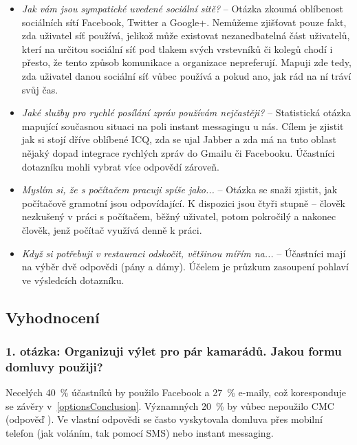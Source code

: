 \documentclass[12pt,oneside,final]{fithesis2}
\begin{document}
\begin{itemize}
    \item \emph{Jak vám jsou sympatické uvedené sociální sitě?} --
        Otázka zkoumá oblíbenost sociálních sítí Facebook, Twitter a Google+. Nemůžeme zjišťovat pouze fakt, zda uživatel síť používá, jelikož může existovat nezanedbatelná část uživatelů, kterí na určitou sociální síť pod tlakem svých vrstevníků či kolegů chodí i přesto, že tento způsob komunikace a organizace nepreferují. Mapuji zde tedy, zda uživatel danou sociální síť vůbec používá a pokud ano, jak rád na ní tráví svůj čas.

    \item \emph{Jaké služby pro rychlé posílání zpráv používám nejčastěji?} --
        Statistická otázka mapující současnou situaci na poli instant messagingu u nás. Cílem je zjistit jak si stojí dříve oblíbené ICQ, zda se ujal Jabber a zda má na tuto oblast nějaký dopad integrace rychlých zpráv do Gmailu či Facebooku. Účastníci dotazníku mohli vybrat více odpovědí zároveň.

    \item \emph{Myslím si, že s počítačem pracuji spíše jako...} --
        Otázka se snaži zjistit, jak počítačově gramotní jsou odpovídající. K dispozici jsou čtyři stupně -- člověk nezkušený v práci s počítačem, běžný uživatel, potom pokročilý a nakonec člověk, jenž počítač využívá denně k práci.

    \item \emph{Když si potřebuji v restauraci odskočit, většinou mířím na...} --
        Účastníci mají na výběr dvě odpovědi (pány a dámy). Účelem je průzkum zasoupení pohlaví ve výsledcích dotazníku.
\end{itemize}

\subsection{Vyhodnocení}

\subsubsection*{\textbf{1. otázka: Organizuji výlet pro pár kamarádů. Jakou formu domluvy použiji?}}
Necelých 40~\% účastníků by použilo Facebook a 27~\% e-maily, což koresponduje se závěry v~\ref{optionsConclusion}. Významných 20~\% by vůbec nepoužilo CMC (odpověď ). Ve vlastní odpovědi se často vyskytovala domluva přes mobilní telefon (jak voláním, tak pomocí SMS) nebo instant messaging.
\end{document}
